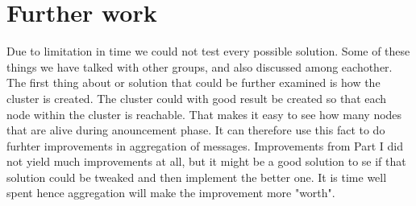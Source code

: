 \documentclass{article}
\begin{document}
  \section{Further work}
    Due to limitation in time we could not test every possible solution. Some 
    of these things we have talked with other groups, and also discussed among
    eachother. The first thing about or solution that could be further examined
    is how the cluster is created. The cluster could with good result be created
    so that each node within the cluster is reachable. That makes it easy to see
    how many nodes that are alive during anouncement phase. It can therefore 
    use this fact to do furhter improvements in aggregation of messages.
    Improvements from Part I did not yield much improvements at all, but it might 
    be a good solution to se if that solution could be tweaked and then implement
    the better one. It is time well spent hence aggregation will make the improvement
    more "worth".
  
\end{document}
